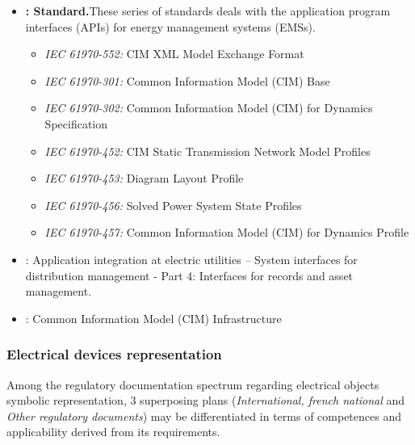 \begin{itemize}
\begin{itemize}
\item  \textbf{: Standard.}These series of standards deals with the application program interfaces (APIs) for energy management systems (EMSs).
\begin{itemize}
\item \textit{IEC 61970-552:} CIM XML Model Exchange Format
\item \textit{IEC 61970-301:} Common Information Model (CIM) Base
\item \textit{IEC 61970-302:} Common Information Model (CIM) for Dynamics Specification
\item \textit{IEC 61970-452:} CIM Static Transmission Network Model Profiles
\item \textit{IEC 61970-453:} Diagram Layout Profile
\item \textit{IEC 61970-456:} Solved Power System State Profiles
\item \textit{IEC 61970-457:} Common Information Model (CIM) for Dynamics Profile
\end{itemize}
\item \textbf{}: Application integration at electric utilities – System interfaces for distribution management - Part 4: Interfaces for records and asset management.
\item  \textbf{}: Common Information Model (CIM) Infrastructure
\end{itemize}
\end{itemize}

\subsubsection{Electrical devices representation}
\label{subsub:AIG:normative:elec-representation}

Among the regulatory documentation spectrum regarding electrical objects symbolic representation, 3 superposing plans (\textit{International, french national} and \textit{Other regulatory documents}) may be differentiated in terms of competences and applicability derived from its requirements. 

